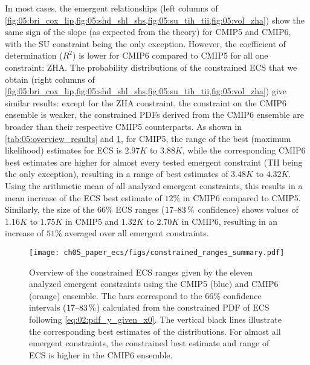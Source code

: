 In most cases, the emergent relationships (left columns of
\cref{fig:05:bri_cox_lip,fig:05:shd_shl_shs,fig:05:su_tih_tii,fig:05:vol_zha})
show the same sign of the slope (as expected from the theory) for \acs{CMIP}5
and \acs{CMIP}6, with the SU constraint being the only exception. However, the
coefficient of determination ($R^2$) is lower for \acs{CMIP}6 compared to
\acs{CMIP}5 for all one constraint: ZHA. The probability distributions of the
constrained \ac{ECS} that we obtain (right columns of
\cref{fig:05:bri_cox_lip,fig:05:shd_shl_shs,fig:05:su_tih_tii,fig:05:vol_zha})
give similar results: except for the ZHA constraint, the constraint on the
\acs{CMIP}6 ensemble is weaker, \ie{} the constrained \acp{PDF} derived from
the \acs{CMIP}6 ensemble are broader than their respective \acs{CMIP}5
counterparts. As shown in \cref{tab:05:overview_results} and
\cref{fig:05:overview_results}, for \acs{CMIP}5, the range of the best (maximum
likelihood) estimates for \acs{ECS} is $2.97 \unit{K}$ to $3.88 \unit{K}$,
while the corresponding \acs{CMIP}6 best estimates are higher for almost every
tested emergent constraint (TII being the only exception), resulting in a range
of best estimates of $3.48 \unit{K}$ to $4.32 \unit{K}$. Using the arithmetic
mean of all analyzed emergent constraints, this results in a mean increase of
the \ac{ECS} best estimate of $12 \unit{\%}$ in \acs{CMIP}6 compared to
\acs{CMIP}5. Similarly, the size of the $66 \unit{\%}$ \ac{ECS} ranges
($\rangeunit{17}{83}{\%}$ confidence) shows values of $1.16 \unit{K}$ to $1.75
\unit{K}$ in \acs{CMIP}5 and $1.32 \unit{K}$ to $2.70 \unit{K}$ in \acs{CMIP}6,
resulting in an increase of $51 \unit{\%}$ averaged over all emergent
constraints.

\begin{figure}[t]
  \centering
  \texttt{[image: 
    ch05\_paper\_ecs/figs/constrained\_ranges\_summary.pdf]}
  \caption[
    Overview of the constrained \acf{ECS} ranges given by the eleven emergent
    constraints using the \acs{CMIP}5 and \acs{CMIP}6 ensemble.
  ]{
    Overview of the constrained \acf{ECS} ranges given by the eleven analyzed
    emergent constraints using the \acs{CMIP}5 (blue) and \acs{CMIP}6 (orange)
    ensemble. The bars correspond to the $66 \unit{\%}$ confidence intervals
    ($\rangeunit{17}{83}{\%}$) calculated from the constrained \acl{PDF} of
    \acs{ECS} following \cref{eq:02:pdf_y_given_x0}. The vertical black lines
    illustrate the corresponding best estimates of the distributions. For
    almost all emergent constraints, the constrained best estimate and range of
    \ac{ECS} is higher in the \acs{CMIP}6 ensemble.
  }
  \label{fig:05:overview_results}
\end{figure}

